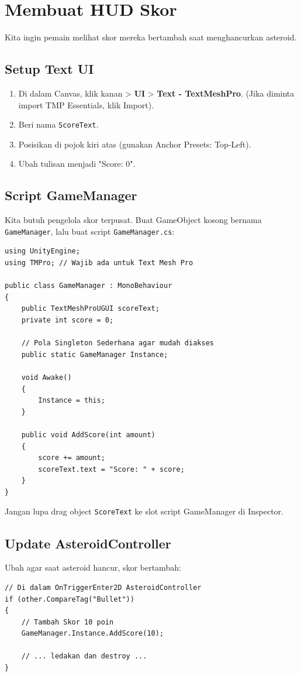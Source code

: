 
\section{Membuat HUD Skor}

Kita ingin pemain melihat skor mereka bertambah saat menghancurkan asteroid.

\subsection{Setup Text UI}
\begin{enumerate}
    \item Di dalam Canvas, klik kanan > \textbf{UI} > \textbf{Text - TextMeshPro}. (Jika diminta import TMP Essentials, klik Import).
    \item Beri nama \texttt{ScoreText}.
    \item Posisikan di pojok kiri atas (gunakan Anchor Presets: Top-Left).
    \item Ubah tulisan menjadi "Score: 0".
\end{enumerate}

\subsection{Script GameManager}
Kita butuh pengelola skor terpusat. Buat GameObject kosong bernama \texttt{GameManager}, lalu buat script \texttt{GameManager.cs}:

\begin{lstlisting}[language={[Sharp]C}]
using UnityEngine;
using TMPro; // Wajib ada untuk Text Mesh Pro

public class GameManager : MonoBehaviour
{
    public TextMeshProUGUI scoreText;
    private int score = 0;

    // Pola Singleton Sederhana agar mudah diakses
    public static GameManager Instance;

    void Awake()
    {
        Instance = this;
    }

    public void AddScore(int amount)
    {
        score += amount;
        scoreText.text = "Score: " + score;
    }
}
\end{lstlisting}

\begin{tips}
Jangan lupa drag object \texttt{ScoreText} ke slot script GameManager di Inspector.
\end{tips}

\subsection{Update AsteroidController}
Ubah agar saat asteroid hancur, skor bertambah:
\begin{lstlisting}[language={[Sharp]C}]
// Di dalam OnTriggerEnter2D AsteroidController
if (other.CompareTag("Bullet"))
{
    // Tambah Skor 10 poin
    GameManager.Instance.AddScore(10); 
    
    // ... ledakan dan destroy ...
}
\end{lstlisting}
